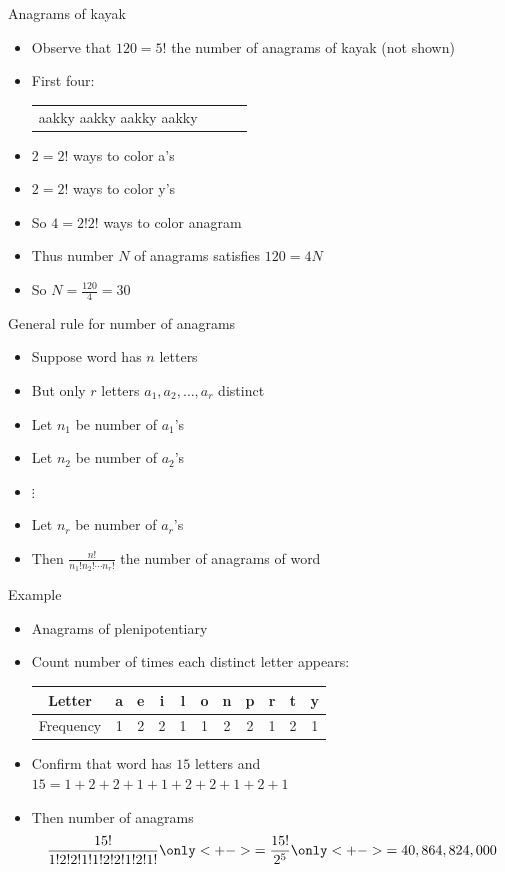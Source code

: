 \documentclass[handout]{beamer}
\theoremstyle{definition}
\begin{document}
\begin{frame}{Anagrams of kayak}
\begin{itemize}
\item Observe that $120=5!$ 
the number of anagrams of kay\alert{a}\alert{k} (not shown)
\item First four:
\begin{tabular}{cccc}
a\alert{a}k\alert{k}y
a\alert{a}\alert{k}ky
\alert{a}ak\alert{k}y
\alert{a}a\alert{k}ky
\end{tabular}
\item $2=2!$ ways to color a's
\item $2=2!$ ways to color y's
\item So $4=2!2!$ ways to color anagram
\item Thus number $N$ of anagrams satisfies
$120=4N$
\item So $N=\frac{120}{4}=30$
\end{itemize}
\end{frame}

\begin{frame}{General rule for number of anagrams}
\begin{itemize}
\item Suppose word has $n$ letters
\item But only $r$ letters $a_1,a_2,\ldots,a_r$ distinct 
\item Let $n_1$ be number of $a_1$'s
\item Let $n_2$ be number of $a_2$'s
\item $\vdots$
\item Let $n_r$ be number of $a_r$'s
\item Then $\frac{n!}{n_1!n_2!\cdots n_r!}$
the number of anagrams of word
\end{itemize}
\end{frame}

\begin{frame}{Example}
\begin{itemize}
\item Anagrams of \alert{plenipotentiary}
\item Count number of times each distinct letter appears:
\begin{tabular}{c|cccccccccc}
Letter&a&e&i&l&o&n&p&r&t&y\\\hline
Frequency&1&2&2&1&1&2&2&1&2&1
\end{tabular}
\item Confirm that word has $15$ letters and
$15=1+2+2+1+1+2+2+1+2+1$
\item Then number of anagrams
\[\frac{15!}{1!2!2!1!1!2!2!1!2!1!}
\only<+->{=\frac{15!}{2^5}}
\only<+->{=40,864,824,000}\]
\end{itemize}
\end{frame}
\end{document}
